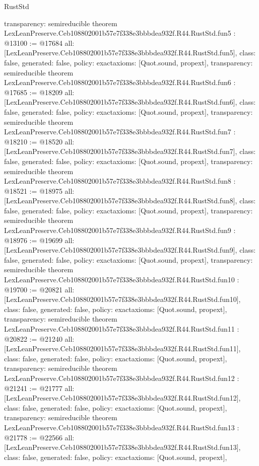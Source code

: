 \begin{lexlean}{RustStd}
\begin{coremodule}
{  transparency: semireducible
}
theorem LexLeanPreserve.Ceb108802001b57e7f338e3bbbdea932f.R44.RustStd.fun5 : @13100 := @17684 {
  all: [LexLeanPreserve.Ceb108802001b57e7f338e3bbbdea932f.R44.RustStd.fun5],
  class: false,
  generated: false,
  policy: exact{axioms: [Quot.sound, propext]},
  transparency: semireducible
}
theorem LexLeanPreserve.Ceb108802001b57e7f338e3bbbdea932f.R44.RustStd.fun6 : @17685 := @18209 {
  all: [LexLeanPreserve.Ceb108802001b57e7f338e3bbbdea932f.R44.RustStd.fun6],
  class: false,
  generated: false,
  policy: exact{axioms: [Quot.sound, propext]},
  transparency: semireducible
}
theorem LexLeanPreserve.Ceb108802001b57e7f338e3bbbdea932f.R44.RustStd.fun7 : @18210 := @18520 {
  all: [LexLeanPreserve.Ceb108802001b57e7f338e3bbbdea932f.R44.RustStd.fun7],
  class: false,
  generated: false,
  policy: exact{axioms: [Quot.sound, propext]},
  transparency: semireducible
}
theorem LexLeanPreserve.Ceb108802001b57e7f338e3bbbdea932f.R44.RustStd.fun8 : @18521 := @18975 {
  all: [LexLeanPreserve.Ceb108802001b57e7f338e3bbbdea932f.R44.RustStd.fun8],
  class: false,
  generated: false,
  policy: exact{axioms: [Quot.sound, propext]},
  transparency: semireducible
}
theorem LexLeanPreserve.Ceb108802001b57e7f338e3bbbdea932f.R44.RustStd.fun9 : @18976 := @19699 {
  all: [LexLeanPreserve.Ceb108802001b57e7f338e3bbbdea932f.R44.RustStd.fun9],
  class: false,
  generated: false,
  policy: exact{axioms: [Quot.sound, propext]},
  transparency: semireducible
}
theorem LexLeanPreserve.Ceb108802001b57e7f338e3bbbdea932f.R44.RustStd.fun10 : @19700 := @20821 {
  all: [LexLeanPreserve.Ceb108802001b57e7f338e3bbbdea932f.R44.RustStd.fun10],
  class: false,
  generated: false,
  policy: exact{axioms: [Quot.sound, propext]},
  transparency: semireducible
}
theorem LexLeanPreserve.Ceb108802001b57e7f338e3bbbdea932f.R44.RustStd.fun11 : @20822 := @21240 {
  all: [LexLeanPreserve.Ceb108802001b57e7f338e3bbbdea932f.R44.RustStd.fun11],
  class: false,
  generated: false,
  policy: exact{axioms: [Quot.sound, propext]},
  transparency: semireducible
}
theorem LexLeanPreserve.Ceb108802001b57e7f338e3bbbdea932f.R44.RustStd.fun12 : @21241 := @21777 {
  all: [LexLeanPreserve.Ceb108802001b57e7f338e3bbbdea932f.R44.RustStd.fun12],
  class: false,
  generated: false,
  policy: exact{axioms: [Quot.sound, propext]},
  transparency: semireducible
}
theorem LexLeanPreserve.Ceb108802001b57e7f338e3bbbdea932f.R44.RustStd.fun13 : @21778 := @22566 {
  all: [LexLeanPreserve.Ceb108802001b57e7f338e3bbbdea932f.R44.RustStd.fun13],
  class: false,
  generated: false,
  policy: exact{axioms: [Quot.sound, propext]},
}
\end{coremodule}
\end{lexlean}
